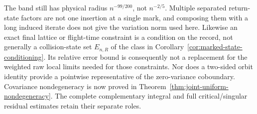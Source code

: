The band still has physical radius $n^{-99/200}$, not $n^{-2/5}$.
Multiple separated return-state factors are not one insertion at a
single mark, and composing them with a long induced iterate does not
give the variation norm used here. Likewise an exact final lattice or
flight-time constraint is a condition on the record, not generally a
collision-state set $E_{n,R}$ of the class in
Corollary~\ref{cor:marked-state-conditioning}. Its relative error bound
is consequently not a replacement for the weighted raw local limits
needed for those constraints. Nor does a two-sided orbit identity
provide a pointwise representative of the zero-variance coboundary.
Covariance nondegeneracy is now proved in
Theorem~\ref{thm:joint-uniform-nondegeneracy}. The complete complementary
integral and full critical/singular residual estimates retain their
separate roles.
